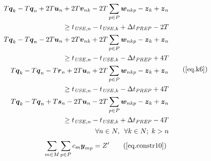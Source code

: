 \begin{equation}
    \begin{split}
        \begin{aligned}
            T \boldsymbol{q}_{k} - T \boldsymbol{q}_{n} + 2T \boldsymbol{u}_{n} 
            + 2T \boldsymbol{v}_{nk} - 2T \sum_{p \in P} \boldsymbol{w}_{nkp} 
            - \boldsymbol{z}_{k} + \boldsymbol{z}_{n}\\
            \ge t_{\mathit{USE},n} - t_{\mathit{USE},k}
            + \Delta t_{\mathit{PREP}} - 2T
        \end{aligned}\\
        \begin{aligned}
            T \boldsymbol{q}_{k} - T \boldsymbol{q}_{n} - 2T \boldsymbol{u}_{n} 
            + 2T \boldsymbol{v}_{nk} + 2T \sum_{p \in P} \boldsymbol{w}_{nkp} 
            - \boldsymbol{z}_{k} + \boldsymbol{z}_{n}\\
            \ge t_{\mathit{USE},n} - t_{\mathit{USE},k}
            - \Delta t_{\mathit{PREP}} + 4T
        \end{aligned}\\
        \begin{aligned}
            T \boldsymbol{q}_{k} - T \boldsymbol{q}_{n} - T \boldsymbol{r}_{n}
            + 2T \boldsymbol{u}_{n} + 2T \sum_{p \in P} \boldsymbol{w}_{nkp} 
            - \boldsymbol{z}_{k} + \boldsymbol{z}_{n}\\
            \ge t_{\mathit{USE},n} - t_{\mathit{USE},k}
            - \Delta t_{\mathit{PREP}} + 4T
        \end{aligned}\\
        \begin{aligned}
            T \boldsymbol{q}_{k} - T \boldsymbol{q}_{n} + T \boldsymbol{s}_{n}
            - 2T \boldsymbol{u}_{n} - 2T \sum_{p \in P} \boldsymbol{w}_{nkp} 
            - \boldsymbol{z}_{k} + \boldsymbol{z}_{n}\\
            \ge t_{\mathit{USE},n} - t_{\mathit{USE},k}
            + \Delta t_{\mathit{PREP}} - 4T
        \end{aligned}\\
        \begin{aligned}
            \forall n \in N, \enspace \forall k \in N; \; k > n
        \end{aligned}\\
    \end{split}
    \tag{\ref{eq.k6}}
\end{equation}
\begin{equation}
    \sum_{m \in M} \sum_{p \in P} c_m \boldsymbol{y}_{mp} = Z^{\prime}
    \tag{\ref{eq.constr10}}
\end{equation}
